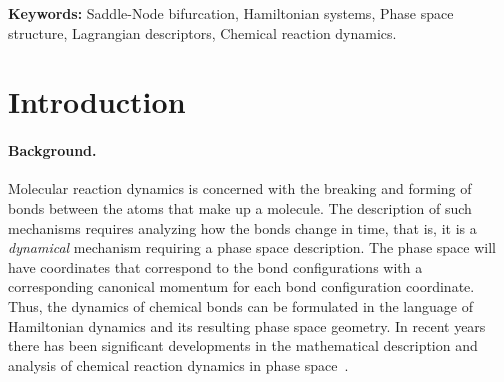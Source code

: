 \documentclass{ws-ijbc}
\begin{document}
\noindent\textbf{Keywords:} Saddle-Node bifurcation, Hamiltonian systems, Phase space structure, Lagrangian descriptors, Chemical reaction dynamics.

\section{Introduction}
\label{sec:intro}
\paragraph*{\bf Background.}
Molecular reaction dynamics is concerned with the breaking and forming of bonds between the atoms that make up a molecule. The description of such mechanisms requires analyzing how the bonds change in time, that is, it is a {\em dynamical} mechanism requiring a phase space description. The phase space will have coordinates that correspond to the bond configurations with a corresponding canonical momentum for each bond configuration coordinate. Thus, the dynamics of chemical bonds can be formulated in the language of Hamiltonian dynamics and its resulting phase space geometry. In recent years there has been significant developments in the mathematical description and analysis of chemical reaction dynamics in phase space~\cite{Komatsuzaki00,uzer2002geometry,Komatsuzaki02a}. 
\end{document}
